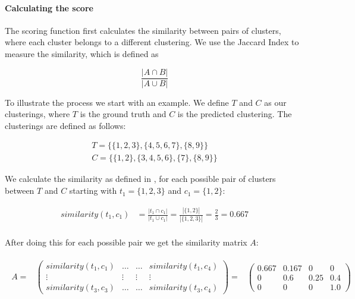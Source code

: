 \paragraph{Calculating the score}
The scoring function first calculates the similarity between pairs of clusters,
where each cluster belongs to a different clustering.
We use the Jaccard Index to measure the similarity, which is defined as

\begin{equation}
    \label{equ:similarity}
    \frac{|A \cap B|}{|A \cup B|}
\end{equation}

To illustrate the process we start with an example.
We define $T$ and $C$ as our clusterings, where $T$ is the ground truth and $C$ is the predicted clustering.
The clusterings are defined as follows:

\begin{gather*}
    T = \{\{1,2,3\},\{4,5,6,7\},\{8,9\}\} \\
    C = \{\{1,2\},\{3,4,5,6\},\{7\},\{8,9\}\}
\end{gather*}

We calculate the similarity as defined in ,
for each possible pair of clusters between $T$ and $C$ starting with $t_1= \{1,2,3\}$ and $c_1 = \{1,2\}$:

\begin{align*}
    similarity(t_1,c_1) &=\frac{|t_1 \cap c_1|}{|t_1 \cup c_1|}
    = \frac{|\{1,2\}|}{|\{1,2,3\}|}
    = \frac{2}{3} = 0.667 \\
\end{align*}

After doing this for each possible pair we get the similarity matrix $A$:

\begin{gather*}
\begin{array}{rcl}
    A = & \left(\begin{array}{cccc}
        similarity(t_1,c_1) & \hdots & \hdots & similarity(t_1,c_4)\\
        \vdots & \vdots & \vdots & \vdots\\
        similarity(t_3,c_3) & \hdots & \hdots & similarity(t_3,c_4) \end{array}\right)
        = & \left(\begin{array}{cccc}
            0.667 & 0.167 & 0 & 0 \\
            0 & 0.6 & 0.25 & 0.4 \\
            0 &  0 & 0 & 1.0 \end{array}\right)
\end{array}
\end{gather*}

